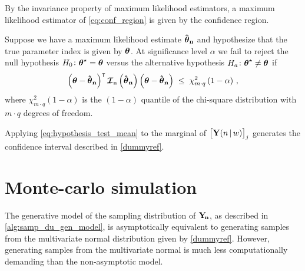\documentclass[
    11pt,
    extrafontsizes,
    article,
    oldfontcommands,
    final,
    oneside,
    openany,
    hidelinks]{memoir}
\begin{document}
By the invariance property of maximum likelihood estimators, a maximum likelihood estimator of \cref{eq:conf_region} is given by the confidence region.
\begin{definition}
Suppose we have a maximum likelihood estimate $\boldsymbol{\mathbf{\hat{\boldsymbol{\mathbf{\theta}}}_{n}}}$ and hypothesize that the true parameter index is given by $\boldsymbol{\mathbf{\theta}}$. At significance level $\alpha$ we fail to reject the null hypothesis $H_0 \colon {\boldsymbol{\mathbf{\theta}}}^{\star} = \boldsymbol{\mathbf{\theta}}$ versus the alternative hypothesis $H_a \colon {\boldsymbol{\mathbf{\theta}}}^{\star} \neq \boldsymbol{\mathbf{\theta}}$ if
\begin{equation}
\label{eq:hypothesis_test_mean}
    \left(\boldsymbol{\mathbf{\theta}} - \boldsymbol{\mathbf{\hat{\boldsymbol{\mathbf{\theta}}}_{n}}}\right)^\intercal \operatorname{\boldsymbol{\mathcal{I}_n}}\left(\boldsymbol{\mathbf{\hat{\boldsymbol{\mathbf{\theta}}}_{n}}}\right) \left(\boldsymbol{\mathbf{\theta}} - \boldsymbol{\mathbf{\hat{\boldsymbol{\mathbf{\theta}}}_{n}}}\right) \;\leq\; \chi_{m \cdot q}^{2} \left(1-\alpha\right)\,,
\end{equation}
where $\chi_{m \cdot q}^2(1 - \alpha)$ is the $(1 - \alpha)$ quantile of the chi-square distribution with $m \cdot q$ degrees of freedom.
\end{definition}

Applying \cref{eq:hypothesis_test_mean} to the marginal of 
$\left[\mathrm{\boldsymbol{\mathbf{Y}}}(n {\,|\,} w)\right]_j$ generates the confidence interval described in 
\cref{dummyref}.

\section{Monte-carlo simulation}
\label{sec:app:monte_carlo}
The generative model of the sampling distribution of $\mathrm{\boldsymbol{\mathbf{Y_{\!n}}}}$, as described in 
\cref{alg:samp_du_gen_model}, is asymptotically equivalent to generating 
samples from the multivariate normal distribution given by \cref{dummyref}. 
However, generating samples from the multivariate normal is much less 
computationally demanding than the non-asymptotic model.
\end{document}
